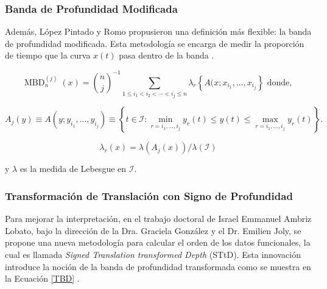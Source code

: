 \subsubsection{Banda de Profundidad Modificada}

Además, López Pintado y Romo propusieron una definición más flexible: la banda de profundidad modificada. Esta metodología se encarga de medir la proporción de tiempo que la curva $x(t)$ pasa dentro de la banda \cite{boxplotFun}.

\begin{equation}
    \operatorname{MBD}_n^{(j)}(x) = \binom{n}{j}^{-1} \sum_{1 \leq i_1<i_2<\cdots<i_j \leq n} \lambda_r \left\{ A(x ; x_{i_{1}}, \dots, x_{i_{j}}\right\} \text{ donde, }
\end{equation}

\begin{equation}
     A_j(y) \equiv A\left(y ; y_{i_1}, \ldots, y_{i_j}\right) \equiv \left\{t \in \mathcal{I}: \min _{r=i_1, \ldots, i_j} y_r(t) \leq y(t) \leq \max _{r=i_1, \ldots, i_j} y_r(t) \right\}.
\end{equation}

\begin{equation}
    \lambda_r(x) = \lambda(A_j(x))/\lambda(\mathcal{I})
\end{equation}

y $\lambda$ es la medida de Lebesgue en $\mathcal{I}$.
\subsubsection{Transformación de Translación con Signo de Profundidad}

    Para mejorar la interpretación, en el trabajo doctoral de Israel Emmanuel Ambriz Lobato, bajo la dirección de la Dra. Graciela González y el Dr. Emilien Joly, se propone una nueva metodología para calcular el orden de los datos funcionales, la cual es llamada \textit{Signed Translation transformed Depth} (STtD). Esta innovación introduce la noción de la banda de profundidad transformada como se muestra en la Ecuación \eqref{TBD} \cite{BandaEmanuel}.
    
